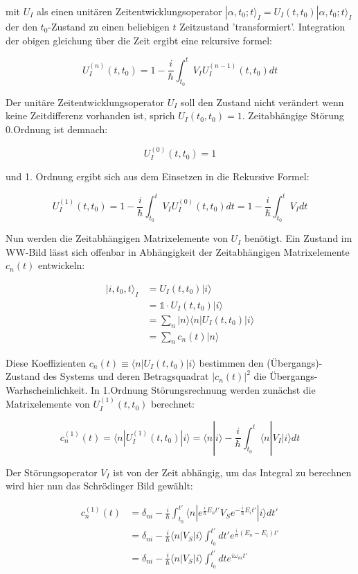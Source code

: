 mit \(U_I\) als einen unitären Zeitentwicklungsoperator \(|\alpha,t_0;t\rangle_I = U_I(t,t_0) |\alpha,t_0;t\rangle_I \) der den \(t_0\)-Zustand zu einen beliebigen \(t\) Zeitzustand 'transformiert'. Integration der obigen gleichung über die Zeit ergibt eine rekursive formel:

\[U_I^{(n)}(t,t_0) = 1-\frac{i}{\hbar}\int_{t_0}^t V_IU_I^{(n-1)}(t,t_0)dt\]

Der unitäre Zeitentwicklungsoperator \(U_I\) soll den Zustand nicht verändert wenn keine Zeitdifferenz vorhanden ist, sprich \(U_I(t_0,t_0)=1\). Zeitabhängige Störung 0.Ordnung ist demnach:

\[U_I^{(0)}(t,t_0)=1\]


und 1. Ordnung ergibt sich aus dem Einsetzen in die Rekursive Formel:

\[U_I^{(1)}(t,t_0) = 1-\frac{i}{\hbar}\int_{t_0}^t V_IU_I^{(0)}(t,t_0)dt = 1-\frac{i}{\hbar}\int_{t_0}^t V_I dt\]

Nun werden die Zeitabhängigen Matrixelemente von \(U_I\) benötigt. Ein Zustand im WW-Bild lässt sich offenbar in Abhängigkeit der Zeitabhängigen Matrixelemente \(c_n(t)\) entwickeln:

\begin{align}
|i,t_0,t\rangle_I &= U_I(t,t_0)|i\rangle \\
&=\mathbb 1\cdot U_I(t,t_0)|i\rangle \\
&=\sum_n |n\rangle \langle n| U_I(t,t_0)|i\rangle \\
&= \sum_n c_n(t) |n\rangle
\end{align}


Diese Koeffizienten \(c_n(t)\equiv \langle n| U_I(t,t_0)|i\rangle \) bestimmen den (Übergangs)-Zustand des Systems und deren Betragsquadrat \(|c_n(t)|^2\) die Übergangs-Warhscheinlichkeit. In 1.Ordnung Störungsrechnung werden zunächst die Matrixelemente von \(U_I^{(1)}(t,t_0)\) berechnet:

\[ c_n^{(1)}(t) =  \langle n| U_I^{(1)}(t,t_0)|i\rangle = \langle n|i\rangle -  \frac{i}{\hbar}\int_{t_0}^t \langle n|V_I|i\rangle dt \]

Der Störungsoperator \(V_I\) ist von der Zeit abhängig, um das Integral zu berechnen wird hier nun das Schrödinger Bild gewählt:

\begin{align}
c_n^{(1)}(t) &= \delta_{ni} -  \frac{i}{\hbar}\int_{t_0}^{t'} \langle n|e^{\frac{i}{\hbar}E_nt'} V_S e^{-\frac{i}{\hbar}E_it'} |i\rangle dt' \\
&= \delta_{ni} -  \frac{i}{\hbar}\langle n|V_S  |i\rangle \int_{t_0}^{t'} dt' e^{\frac{i}{\hbar}(E_n-E_i)t'} \\
&= \delta_{ni} -  \frac{i}{\hbar}\langle n|V_S  |i\rangle \int_{t_0}^{t'} dt e^{i\omega_{ni}t'}
\end{align}

